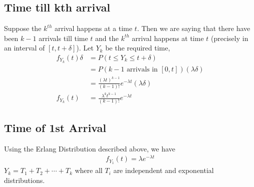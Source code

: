 \documentclass[../probability-notes.tex]{subfiles}
\begin{document}
    \subsection{Time till kth arrival}
    Suppose the $k^{th}$ arrival happens at a time $t$. Then we are saying that there have been $k-1$ arrivals till time $t$ and the $k^{th}$ arrival happens at time $t$ (precisely in an interval of $[t, t+\delta]$). Let $Y_{k}$ be the required time,
    \begin{align*}
        f_{Y_{k}}(t)\delta &= P(t \leq Y_{k} \leq t+\delta)\\
                    &= P(\text{$k-1$ arrivals  in $[0,t]$}) (\lambda \delta)\\
                    &= \frac{(\lambda t)^{k-1}}{(k-1)!}e^{-\lambda t}(\lambda \delta)\\
        f_{Y_{k}}(t) &= \frac{\lambda^{k} t^{k-1}}{(k-1)!}e^{-\lambda t} \tag*{Erland Distribution}
    \end{align*}

    \subsection{Time of 1st Arrival}
    Using the Erlang Distribution described above, we have
    \begin{align*}
        f_{Y_{1}}(t) = \lambda e^{-\lambda t}
    \end{align*}
    $Y_{k} = T_{1} + T_{2} + \cdots + T_{k}$ where all $T_{i}$ are independent and exponential distributions.
\end{document}
